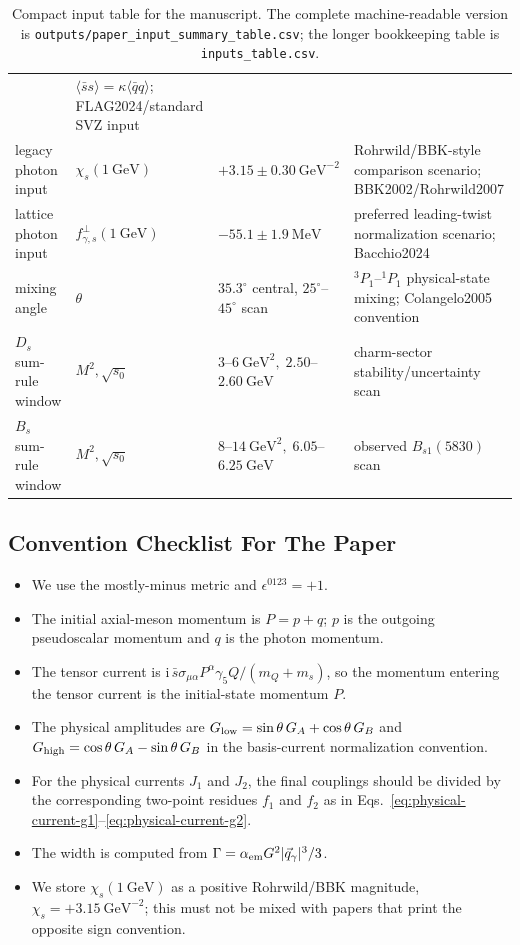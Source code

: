 \documentclass[11pt]{article}
\newcommand{\Bsone}{B_{s1}}
\newcommand{\GeV}{\mathrm{GeV}}
\newcommand{\ii}{\mathrm{i}}
\begin{document}
\begin{table}[htbp]
{\begin{tabular}{llll}
      & $\langle\bar s s\rangle=\kappa\langle\bar q q\rangle$; FLAG2024/standard SVZ input\\
    legacy photon input
      & $\chi_s(1~\GeV)$
      & $+3.15\pm0.30~\GeV^{-2}$
      & Rohrwild/BBK-style comparison scenario; BBK2002/Rohrwild2007\\
    lattice photon input
      & $f_{\gamma,s}^{\perp}(1~\GeV)$
      & $-55.1\pm1.9~\mathrm{MeV}$
      & preferred leading-twist normalization scenario; Bacchio2024\\
    mixing angle
      & $\theta$
      & $35.3^\circ$ central, $25^\circ$--$45^\circ$ scan
      & ${}^3P_1$--${}^1P_1$ physical-state mixing; Colangelo2005 convention\\
    $D_s$ sum-rule window
      & $M^2,\sqrt{s_0}$
      & $3$--$6~\GeV^2,\;2.50$--$2.60~\GeV$
      & charm-sector stability/uncertainty scan\\
    $B_s$ sum-rule window
      & $M^2,\sqrt{s_0}$
      & $8$--$14~\GeV^2,\;6.05$--$6.25~\GeV$
      & observed $\Bsone(5830)$ scan\\
    \bottomrule
  \end{tabular}%
  }
  \caption{Compact input table for the manuscript.  The complete
  machine-readable version is \texttt{outputs/paper\_input\_summary\_table.csv};
  the longer bookkeeping table is \texttt{inputs\_table.csv}.}
  \label{tab:paper-input-summary}
\end{table}

\subsection{Convention Checklist For The Paper}

\begin{itemize}
  \item We use the mostly-minus metric and $\epsilon^{0123}=+1$.
  \item The initial axial-meson momentum is $P=p+q$; $p$ is the outgoing
  pseudoscalar momentum and $q$ is the photon momentum.
  \item The tensor current is
  $\ii\,\bar s\sigma_{\mu\alpha}P^\alpha\gamma_5 Q/(m_Q+m_s)$, so the
  momentum entering the tensor current is the initial-state momentum $P$.
  \item The physical amplitudes are
  $G_{\rm low}=\sin\theta\,G_A+\cos\theta\,G_B$ and
  $G_{\rm high}=\cos\theta\,G_A-\sin\theta\,G_B$ in the basis-current
  normalization convention.
  \item For the physical currents $J_1$ and $J_2$, the final couplings should
  be divided by the corresponding two-point residues $f_1$ and $f_2$ as in
  Eqs.~\eqref{eq:physical-current-g1}--\eqref{eq:physical-current-g2}.
  \item The width is computed from
  $\Gamma=\alpha_{\rm em}G^2|\vec q_\gamma|^3/3$.
  \item We store $\chi_s(1~\GeV)$ as a positive Rohrwild/BBK magnitude,
  $\chi_s=+3.15~\GeV^{-2}$; this must not be mixed with papers that print the
  opposite sign convention.
\end{itemize}
\end{document}
